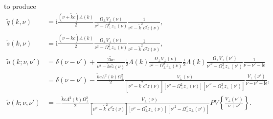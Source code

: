 to produce
\begin{equation}
\begin{split}
\tilde{q}(k,\nu) &= \mathrm{i}\frac{(\nu + \tilde{k}c)\Lambda(k)}{2}\frac{\Omega_\perp V_\perp(\nu)}{\nu^2 - \Omega_\perp^2z_\perp(\nu)}\frac{1}{\nu^2 - \tilde{k}^2c^2\tilde{z}(\nu)},\\
\tilde{s}(k,\nu) &= \mathrm{i}\frac{(\nu - \tilde{k}c)\Lambda(k)}{2}\frac{\Omega_\perp V_\perp(\nu)}{\nu^2 - \Omega_\perp^2z_\perp(\nu)}\frac{1}{\nu^2 - \tilde{k}^2c^2\tilde{z}(\nu)},\\[0.5em]
\tilde{u}(k;\nu,\nu') &= \delta(\nu - \nu') + \frac{2\tilde{k}c}{\nu^2 - \tilde{k}c\tilde{z}(\nu)}\frac{\mathrm{i}}{2}\Lambda(k)\frac{\Omega_\perp V_\perp(\nu)}{\nu^2 - \Omega_\perp^2z_\perp(\nu)}\frac{\mathrm{i}}{2}\Lambda(k)\frac{\Omega_\perp V_\perp(\nu')}{\nu'^2 - \Omega_\perp^2z_\perp(\nu')}\frac{1}{\nu - \nu' - \mathrm{i}\epsilon}\\
&= \delta(\nu - \nu') - \frac{\tilde{k}c\Lambda^2(k)\Omega_\perp^2}{2}\frac{V_\perp(\nu)}{\left[\nu^2 - \tilde{k}^2c^2\tilde{z}(\nu)\right][\nu^2 - \Omega_\perp^2z_\perp(\nu)][\nu'^2 - \Omega_\perp^2z_\perp(\nu')]}\frac{V_\perp(\nu')}{\nu - \nu' - \mathrm{i}\epsilon},\\[0.5em]
\tilde{v}(k;\nu,\nu') &= - \frac{\tilde{k}c\Lambda^2(k)\Omega_\perp^2}{2}\frac{V_\perp(\nu)}{\left[\nu^2 - \tilde{k}^2c^2\tilde{z}(\nu)\right][\nu^2 - \Omega_\perp^2z_\perp(\nu)][\nu'^2 - \Omega_\perp^2z_\perp(\nu')]}PV\left\{\frac{V_\perp(\nu')}{\nu + \nu'}\right\}.
\end{split}
\end{equation}